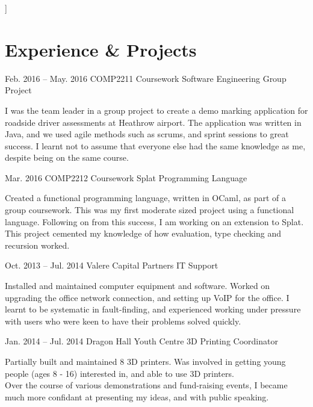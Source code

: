 \documentclass{tccv}
\begin{document}
\hline
\bigskip
]

\section{Experience \& Projects}

    \begin{eventlist}
    
        \item{Feb. 2016 -- May. 2016}
             {COMP2211 Coursework}
             {Software Engineering Group Project}
        
        I was the team leader in a group project to create a demo marking application for roadside driver assessments at Heathrow airport. The application was written in Java, and we used agile methods such as scrums, and sprint sessions to great success. I learnt not to assume that everyone else had the same knowledge as me, despite being on the same course.
        
        \item{Mar. 2016}
             {COMP2212 Coursework}
             {Splat Programming Language}
        
        Created a functional programming language, written in OCaml, as part of a group coursework. This was my first moderate sized project using a functional language. Following on from this success, I am working on an extension to Splat. This project cemented my knowledge of how evaluation, type checking and recursion worked.
        
        \item{Oct. 2013 -- Jul. 2014}
             {Valere Capital Partners}
             {IT Support}
        
        Installed and maintained computer equipment and software. Worked on upgrading the office network connection, and setting up VoIP for the office. I learnt to be systematic in fault-finding, and experienced working under pressure with users who were keen to have their problems solved quickly.\newline\newline\newline\newline
        
        \item{Jan. 2014 -- Jul. 2014}
             {Dragon Hall Youth Centre}
             {3D Printing Coordinator}
        
        Partially built and maintained 8 3D printers. Was involved in getting young people (ages 8 - 16) interested in, and able to use 3D printers.\\
        Over the course of various demonstrations and fund-raising events, I became much more confidant at presenting my ideas, and with public speaking.
        

\end{eventlist}
\end{document}
